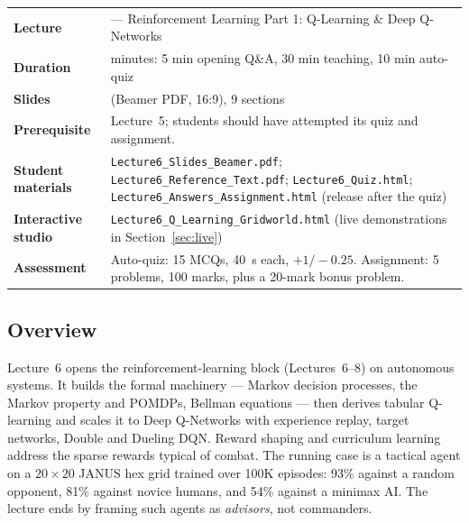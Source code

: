 \documentclass[11pt]{article}
\begin{document}
\begin{center}\small\renewcommand{\arraystretch}{1.25}\begin{tabularx}{\textwidth}{@{}>{\bfseries}p{3.3cm}>{\raggedright\arraybackslash}X@{}}\toprule

\textcolor{NavyN}{Lecture}&6 --- Reinforcement Learning Part 1: Q-Learning \& Deep Q-Networks\\
\textcolor{NavyN}{Duration}&45 minutes: 5 min opening Q\&A, 30 min teaching, 10 min auto-quiz\\
\textcolor{NavyN}{Slides}&19 (Beamer PDF, 16:9), 9 sections\\
\textcolor{NavyN}{Prerequisite}&Lecture~5; students should have attempted its quiz and assignment.\\
\textcolor{NavyN}{Student materials}&\texttt{Lecture6\_Slides\_Beamer.pdf}; \texttt{Lecture6\_Reference\_Text.pdf}; \texttt{Lecture6\_Quiz.html}; \texttt{Lecture6\_Answers\_Assignment.html} (release after the quiz)\\
\textcolor{NavyN}{Interactive studio}&\texttt{Lecture6\_Q\_Learning\_Gridworld.html} (live demonstrations in Section~\ref{sec:live})\\
\textcolor{NavyN}{Assessment}&Auto-quiz: 15 MCQs, 40~s each, $+1/-0.25$. Assignment: 5 problems, 100 marks, plus a 20-mark bonus problem.\\\bottomrule\end{tabularx}\end{center}

\subsection*{Overview}Lecture~6 opens the reinforcement-learning block (Lectures~6--8) on autonomous systems. It builds the formal machinery --- Markov decision processes, the Markov property and POMDPs, Bellman equations --- then derives tabular Q-learning and scales it to Deep Q-Networks with experience replay, target networks, Double and Dueling DQN. Reward shaping and curriculum learning address the sparse rewards typical of combat. The running case is a tactical agent on a $20\times20$ JANUS hex grid trained over 100K episodes: 93\% against a random opponent, 81\% against novice humans, and 54\% against a minimax AI. The lecture ends by framing such agents as \emph{advisors}, not commanders.
\end{document}
